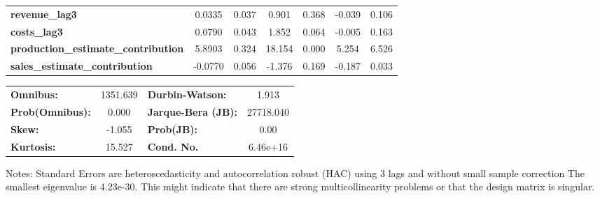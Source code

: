 \begin{center}
\begin{tabular}{lcccccc}
\textbf{revenue\_lag3}                      &       0.0335  &        0.037     &     0.901  &         0.368        &       -0.039    &        0.106     \\
\textbf{costs\_lag3}                        &       0.0790  &        0.043     &     1.852  &         0.064        &       -0.005    &        0.163     \\
\textbf{production\_estimate\_contribution} &       5.8903  &        0.324     &    18.154  &         0.000        &        5.254    &        6.526     \\
\textbf{sales\_estimate\_contribution}      &      -0.0770  &        0.056     &    -1.376  &         0.169        &       -0.187    &        0.033     \\
\bottomrule
\end{tabular}
\begin{tabular}{lclc}
\textbf{Omnibus:}       & 1351.639 & \textbf{  Durbin-Watson:     } &     1.913  \\
\textbf{Prob(Omnibus):} &   0.000  & \textbf{  Jarque-Bera (JB):  } & 27718.040  \\
\textbf{Skew:}          &  -1.055  & \textbf{  Prob(JB):          } &      0.00  \\
\textbf{Kurtosis:}      &  15.527  & \textbf{  Cond. No.          } &  6.46e+16  \\
\bottomrule
\end{tabular}
\end{center}

Notes: \newline
 [1] Standard Errors are heteroscedasticity and autocorrelation robust (HAC) using 3 lags and without small sample correction \newline
 [2] The smallest eigenvalue is 4.23e-30. This might indicate that there are \newline
 strong multicollinearity problems or that the design matrix is singular.